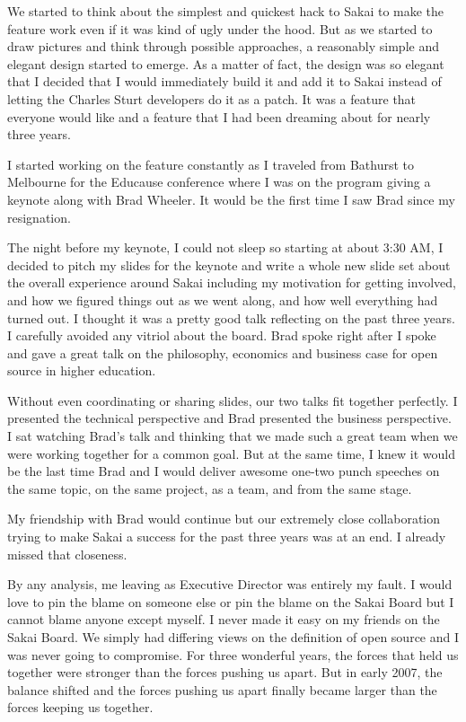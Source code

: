 \documentclass[12pt]{book}
\begin{document}
We started to think about the simplest and quickest hack to Sakai to make the feature
work even if it was kind of ugly under the hood.  But as we started to draw pictures
and think through possible approaches, a reasonably simple and elegant design started
to emerge.  As a matter of fact, the design was so elegant that
I decided that I would immediately build it and add it to Sakai instead of letting
the Charles Sturt developers do it as a patch.   It was a feature that everyone
would like and a feature that I had been dreaming about for nearly three years.

I started working on the feature constantly as I traveled from Bathurst to Melbourne
for the Educause conference where I was on the program giving a keynote along with Brad
Wheeler.  It would be the first time I saw Brad since my resignation.

The night before my keynote, I could not sleep so starting at about 3:30 AM, I decided
to pitch my slides for the keynote and write a whole new slide set about the overall experience
around Sakai including my motivation for getting involved, and how we figured things out
as we went along, and how well everything had turned out.  I thought it was a pretty
good talk reflecting on the past three years.  I carefully avoided any vitriol about the board.
Brad spoke right after I spoke and gave a great talk on the philosophy, economics
and business case
for open source in higher education.

Without even coordinating or sharing slides, our two talks fit together perfectly.
I presented the technical perspective and Brad presented the business perspective.
I sat watching Brad's talk and thinking that we made such a great team when we were
working together for a common goal.   But at the same time, I knew it would be the
last time Brad and I would deliver awesome one-two punch speeches on the same
topic, on the same project, as a team, and from the same stage.

My friendship with Brad would continue but our extremely close collaboration
trying to make Sakai a success for the past three years was at an end.  I already missed
that closeness.

By any analysis, me leaving as Executive Director was entirely my fault.
I would love to pin the blame on someone else or pin the blame on the Sakai
Board but I cannot blame anyone except myself.
I never made it easy on my friends on the Sakai Board.
We simply had differing views on the definition of open source and I was never
going to compromise.  For three wonderful years, the forces that held
us together were stronger than the forces pushing us apart.   But in early
2007, the balance shifted and the forces pushing us apart finally became
larger than the forces keeping us together.
\end{document}
